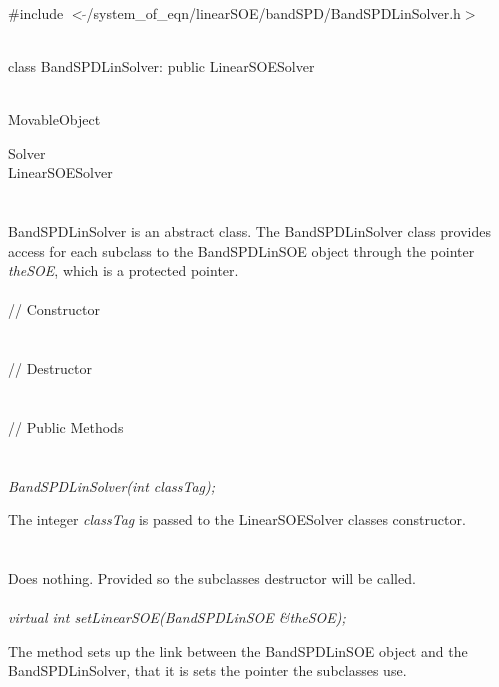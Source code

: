 
   \\
\#include $<\tilde{ }$/system\_of\_eqn/linearSOE/bandSPD/BandSPDLinSolver.h$>$  


  \\
class BandSPDLinSolver: public LinearSOESolver  


 \\
MovableObject 

\indent\indent  Solver \\
\indent\indent\indent LinearSOESolver \\
\indent\indent\indent{} \\

  \\
\indent BandSPDLinSolver is an abstract class. The BandSPDLinSolver
class provides access for each subclass to the BandSPDLinSOE object
through the pointer {\em theSOE}, which is a protected pointer. \\

  \\
\indent\indent // Constructor \\
\indent{}  \\ \\
\indent\indent // Destructor \\
\indent{}\\  \\
\indent\indent // Public Methods \\
\indent{} \\

  \\
{\em BandSPDLinSolver(int classTag);}  

The integer {\em classTag} is passed to the LinearSOESolver classes
constructor. \\ 

 \\
\\ 
Does nothing. Provided so the subclasses destructor will be called. \\

  \\
{\em virtual int setLinearSOE(BandSPDLinSOE \&theSOE);} 

The method sets up the link between the BandSPDLinSOE object and the
BandSPDLinSolver, that it is sets the pointer the subclasses use.  \\





